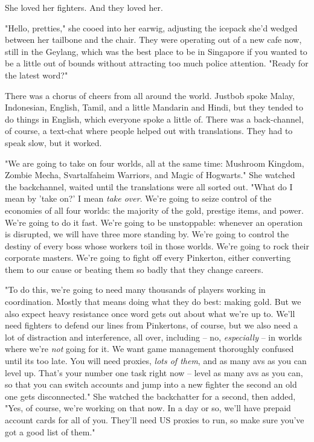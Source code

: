 She loved her fighters. And they loved her.

"Hello, pretties," she cooed into her earwig, adjusting the icepack
she'd wedged between her tailbone and the chair. They were
operating out of a new cafe now, still in the Geylang, which was
the best place to be in Singapore if you wanted to be a little out
of bounds without attracting too much police attention. "Ready for
the latest word?"

There was a chorus of cheers from all around the world. Justbob
spoke Malay, Indonesian, English, Tamil, and a little Mandarin and
Hindi, but they tended to do things in English, which everyone
spoke a little of. There was a back-channel, of course, a text-chat
where people helped out with translations. They had to speak slow,
but it worked.

"We are going to take on four worlds, all at the same time:
Mushroom Kingdom, Zombie Mecha, Svartalfaheim Warriors, and Magic
of Hogwarts." She watched the backchannel, waited until the
translations were all sorted out. "What do I mean by 'take on?' I
mean \emph{take over}. We're going to seize control of the
economies of all four worlds: the majority of the gold, prestige
items, and power. We're going to do it fast. We're going to be
unstoppable: whenever an operation is disrupted, we will have three
more standing by. We're going to control the destiny of every boss
whose workers toil in those worlds. We're going to rock their
corporate masters. We're going to fight off every Pinkerton, either
converting them to our cause or beating them so badly that they
change careers.

"To do this, we're going to need many thousands of players working
in coordination. Mostly that means doing what they do best: making
gold. But we also expect heavy resistance once word gets out about
what we're up to. We'll need fighters to defend our lines from
Pinkertons, of course, but we also need a lot of distraction and
interference, all over, including -- no, \emph{especially} -- in
worlds where we're \emph{not} going for it. We want game management
thoroughly confused until its too late. You will need proxies,
\emph{lots of them}, and as many avs as you can level up. That's
your number one task right now -- level as many avs as you can, so
that you can switch accounts and jump into a new fighter the second
an old one gets disconnected." She watched the backchatter for a
second, then added, "Yes, of course, we're working on that now. In
a day or so, we'll have prepaid account cards for all of you.
They'll need US proxies to run, so make sure you've got a good list
of them."

